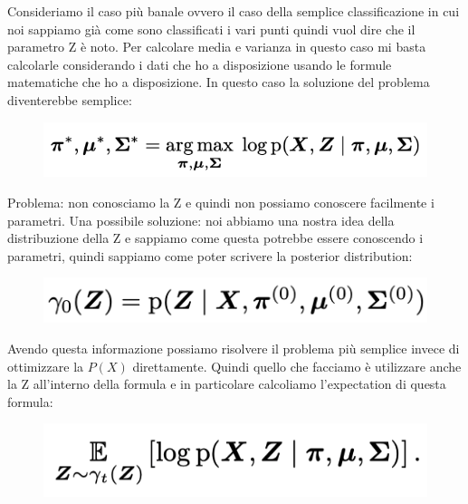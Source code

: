 \documentclass[14pt]{extreport}
\begin{document}
Consideriamo il caso più banale ovvero il caso della semplice classificazione in cui noi sappiamo già come sono classificati i vari punti quindi vuol dire
che il parametro Z è noto. Per calcolare media e varianza in questo caso mi basta calcolarle considerando i dati che ho a disposizione usando le formule 
matematiche che ho a disposizione.
In questo caso la soluzione del problema diventerebbe semplice:

\begin{figure}[H] 
\centering
\includegraphics[width=0.7\linewidth]{549.jpeg}
\end{figure}

Problema: non conosciamo la Z e quindi non possiamo conoscere facilmente i parametri. 
Una possibile soluzione: noi abbiamo una nostra idea della distribuzione della Z e sappiamo come questa potrebbe essere conoscendo i parametri, quindi 
sappiamo come poter scrivere la posterior distribution:

\begin{figure}[H] 
\centering
\includegraphics[width=0.7\linewidth]{550.jpeg}
\end{figure}

Avendo questa informazione possiamo risolvere il problema più semplice invece di ottimizzare la $P(X)$ direttamente.
Quindi quello che facciamo è utilizzare anche la Z all'interno della formula e in particolare calcoliamo l'expectation di questa formula:


\begin{figure}[H] 
\centering
\includegraphics[width=0.7\linewidth]{551.jpeg}
\end{figure}
\end{document}
